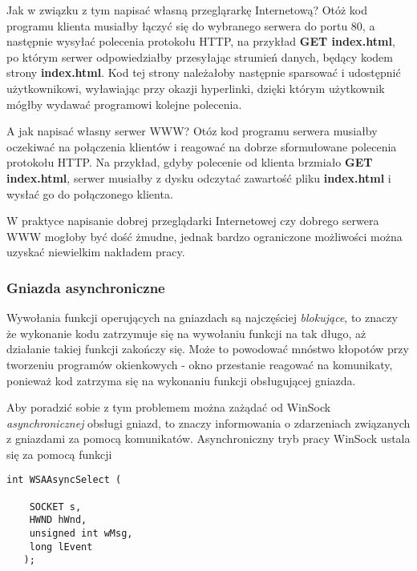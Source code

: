 Jak w związku z tym napisać własną przegląrarkę Internetową? Otóż kod programu klienta
musiałby łączyć się do wybranego serwera do portu 80, a następnie wysyłać polecenia
protokołu HTTP, na przykład {\bf GET index.html}, po którym serwer odpowiedziałby
przesyłając strumień danych, będący kodem strony {\bf index.html}. Kod tej strony należałoby
następnie sparsować i udostępnić użytkownikowi, wyławiając przy okazji hyperlinki, dzięki
którym użytkownik mógłby wydawać programowi kolejne polecenia.

A jak napisać własny serwer WWW? Otóz kod programu serwera musiałby oczekiwać na połączenia
klientów i reagować na dobrze sformułowane polecenia protokołu HTTP. Na przykład, gdyby polecenie
od klienta brzmiało {\bf GET index.html}, serwer musiałby z dysku odczytać zawartość pliku
{\bf index.html} i wysłać go do połączonego klienta. 

W praktyce napisanie dobrej przeglądarki Internetowej czy dobrego serwera WWW mogłoby być dość żmudne, jednak
bardzo ograniczone możliwości można uzyskać niewielkim nakładem pracy. 

\subsubsection{Gniazda asynchroniczne}

Wywołania funkcji operujących na gniazdach są najczęściej {\em blokujące}, to znaczy że
wykonanie kodu zatrzymuje się na wywołaniu funkcji na tak długo, aż działanie takiej funkcji
zakończy się. Może to powodować mnóstwo kłopotów przy tworzeniu programów okienkowych - okno
przestanie reagować na komunikaty, ponieważ kod zatrzyma się na wykonaniu funkcji obsługującej gniazda.

Aby poradzić sobie z tym problemem można zażądać od WinSock {\em asynchronicznej} obsługi gniazd, to
znaczy informowania o zdarzeniach związanych z gniazdami za pomocą komunikatów. 
Asynchroniczny tryb pracy WinSock ustala się za pomocą funkcji 

\begin{scriptsize}
\begin{verbatim}
int WSAAsyncSelect (

    SOCKET s,	
    HWND hWnd,	
    unsigned int wMsg,	
    long lEvent	
   );
\end{verbatim}
\end{scriptsize}
